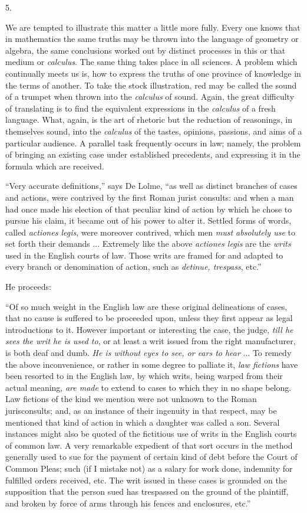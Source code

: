 5.

We are tempted to illustrate this matter a little
more fully. Every one knows that in mathematics the same truths may be
thrown into the language of geometry or algebra, the same conclusions
worked out by distinct processes in this or that medium or \emph{calculus}.
The same thing takes place in all sciences. A problem which
continually meets us is, how to express the truths of one province of
knowledge in the terms of another. To take the stock illustration, red
may be called the sound of a trumpet when thrown into the \emph{calculus}
of sound. Again, the great difficulty of translating is to find the
equivalent expressions in the \emph{calculus} of a fresh language.
What, again, is the art of rhetoric but the reduction of reasonings,
in themselves sound, into the \emph{calculus} of the tastes, opinions, passions, and aims of a particular audience. A parallel task
frequently occurs in law; namely, the problem of bringing an existing
case under established precedents, and expressing it in the formula
which are received.

``Very
accurate definitions,'' says De Lolme, ``as well as distinct branches of
cases and actions, were contrived by the first Roman jurist consults:
and when a man had once made his election of that peculiar kind of
action by which he chose to pursue his claim, it became out of his
power to alter it. Settled forms of words, called \emph{actiones legis},
were moreover contrived, which men \emph{must absolutely use} to set
forth their demands ... Extremely like the above \emph{actiones legis}
are the \emph{writs} used in the English courts of law. Those writs
are framed for and adapted to every branch or denomination of action,
such as \emph{detinue, trespass}, etc.''

He proceeds:

``Of
so much weight in the English law are these original delineations of
cases, that no cause is suffered to be proceeded upon, unless they
first appear as legal introductions to it. However important or
interesting the case, the judge, \emph{till he sees the writ he is used
to}, or at least a writ issued from the right manufacturer, is both
deaf and dumb. \emph{He is without eyes to see, or ears to hear} ...
To remedy the above inconvenience, or rather in some degree to
palliate it, \emph{law fictions} have been resorted to in the English
law, by which writs, being warped from their actual meaning, \emph{are
made} to extend to cases to which they in no shape belong. Law
fictions of the kind we mention were not unknown to the Roman
jurisconsults; and, as an instance of their ingenuity in that respect,
may be mentioned that kind of action in which a daughter was called a
son. Several instances might also be quoted of the fictitious use of
writs in the English courts of common law. A very remarkable expedient
of that sort occurs in the method generally used to sue for the
payment of certain kind of debt before the Court of Common Pleas; such
(if I mistake not) as a salary for work done, indemnity for fulfilled
orders received, etc. The writ issued in these cases is grounded on
the supposition that the person sued has trespassed on the ground of
the plaintiff, and broken by force of arms through his fences and
enclosures, etc.''

